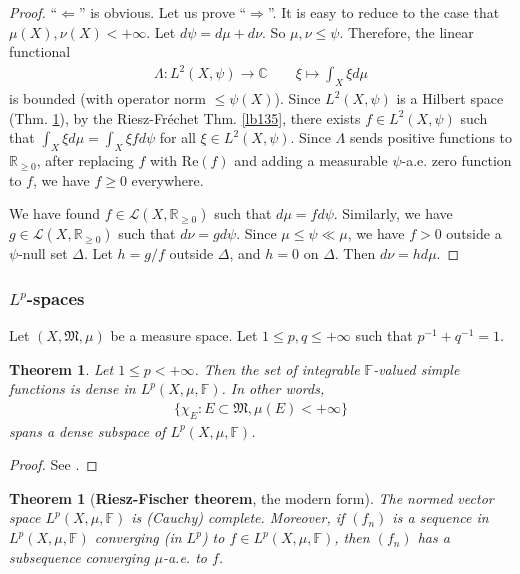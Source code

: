 \documentclass[12pt,b5paper,notitlepage]{article}
\theoremstyle{definition}
\theoremstyle{plain}
\newtheorem{thm}[df]{Theorem}
\newcommand{\fk}{\mathfrak}
\newcommand{\mc}{\mathcal}
\newcommand{\Cbb}{\mathbb C}
\newcommand{\Rbb}{\mathbb R}
\newcommand{\Real}{\mathrm{Re}}
\newcommand{\Fbb}{\mathbb F}
\numberwithin{equation}{section}
\begin{document}
\begin{proof}[Proof]
``$\Leftarrow$'' is obvious. Let us prove ``$\Rightarrow$''. It is easy to reduce to the case that $\mu(X),\nu(X)<+\infty$. Let $d\psi=d\mu+d\nu$. So $\mu,\nu\leq\psi$. Therefore, the linear functional
\begin{gather*}
\Lambda: L^2(X,\psi)\rightarrow\Cbb\qquad \xi\mapsto \int_X \xi d\mu
\end{gather*}
is bounded (with operator norm $\leq\psi(X)$). Since $L^2(X,\psi)$ is a Hilbert space (Thm. \ref{lb26}), by the Riesz-Fr\'echet Thm. \ref{lb135}, there exists $f\in L^2(X,\psi)$ such that $\int_X\xi d\mu=\int_X \xi fd\psi$ for all $\xi\in L^2(X,\psi)$. Since $\Lambda$ sends positive functions to $\Rbb_{\geq0}$, after replacing $f$ with $\Real(f)$ and adding a measurable $\psi$-a.e. zero function to $f$, we have $f\geq0$ everywhere.


We have found $f\in\mc L(X,\Rbb_{\geq0})$ such that $d\mu=fd\psi$. Similarly, we have $g\in\mc L(X,\Rbb_{\geq0})$ such that $d\nu=gd\psi$.  Since $\mu\leq\psi \ll \mu$, we have $f>0$ outside a $\psi$-null set $\Delta$. Let $h=g/f$ outside $\Delta$, and $h=0$ on $\Delta$. Then $d\nu=hd\mu$. 
\end{proof}












\subsubsection{$L^p$-spaces}


Let $(X,\fk M,\mu)$ be a measure space. Let $1\leq p,q\leq +\infty$ such that $p^{-1}+q^{-1}=1$.

\begin{thm}\label{lb79}
Let $1\leq p<+\infty$. Then the set of integrable $\Fbb$-valued simple functions is dense in $L^p(X,\mu,\Fbb)$. In other words,
\begin{align*}
\{\chi_E:E\subset\fk M,\mu(E)<+\infty\}
\end{align*}
spans a dense subspace of $L^p(X,\mu,\Fbb)$.
\end{thm}

\begin{proof}
See \cite[Sec. 27.2]{Gui-A}.
\end{proof}


\begin{thm}[\textbf{Riesz-Fischer theorem}, the modern form]\label{lb26}
The normed vector space $L^p(X,\mu,\Fbb)$ is (Cauchy) complete. Moreover, if $(f_n)$ is a sequence in $L^p(X,\mu,\Fbb)$ converging (in $L^p$) to $f\in L^p(X,\mu,\Fbb)$, then $(f_n)$ has a subsequence converging $\mu$-a.e. to $f$.
\end{thm}
\end{document}
